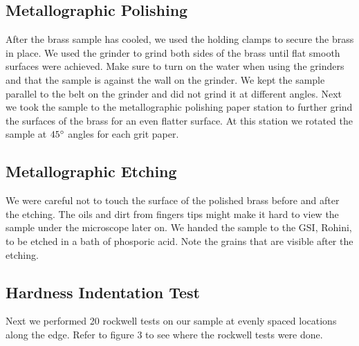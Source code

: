 \documentclass{article}
\begin{document}
\subsection{Metallographic Polishing}
After the brass sample has cooled, we used the holding clamps to secure the brass in place. We used the grinder to grind both sides of the brass until flat smooth surfaces were achieved. Make sure to turn on the water when using the grinders and that the sample is against the wall on the grinder. We kept the sample parallel to the belt on the grinder and did not grind it at different angles. Next we took the sample to the metallographic polishing paper station to further grind the surfaces of the brass for an even flatter surface. At this station we rotated the sample at $45\degree$ angles for each grit paper.

\subsection{Metallographic Etching}
We were careful not to touch the surface of the polished brass before and after the etching. The oils and dirt from fingers tips might make it hard to view the sample under the microscope later on. We handed the sample to the GSI, Rohini, to be etched in a bath of phosporic acid. Note the grains that are visible after the etching.

\subsection{Hardness Indentation Test}
Next we performed 20 rockwell tests on our sample at evenly spaced locations along the edge. Refer to figure 3 to see where the rockwell tests were done.
\end{document}
